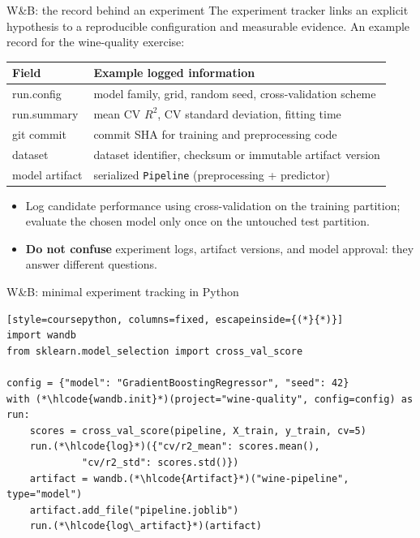 \begin{frame}{W\&B: the record behind an experiment}
\begingroup\footnotesize
The experiment tracker links an explicit hypothesis to a reproducible configuration and measurable evidence. An example record for the wine-quality exercise:
\vspace{0.4em}
\begin{tabularx}{\textwidth}{>{\ttfamily}l X}
\normalfont\bfseries Field & \bfseries Example logged information \\
\toprule
run.config & model family, grid, random seed, cross-validation scheme \\
run.summary & mean CV $R^2$, CV standard deviation, fitting time \\
git commit & commit SHA for training and preprocessing code \\
dataset & dataset identifier, checksum or immutable artifact version \\
model artifact & serialized \texttt{Pipeline} (preprocessing + predictor) \\
\bottomrule
\end{tabularx}
\par\endgroup
\vspace{0.5em}
\begin{itemize}\footnotesize
\item Log candidate performance using cross-validation on the training partition; evaluate the chosen model only once on the untouched test partition.
\item \textbf{Do not confuse} experiment logs, artifact versions, and model approval: they answer different questions.
\end{itemize}
\coursefooter
\end{frame}

\begin{frame}[fragile]{W\&B: minimal experiment tracking in Python}
\begin{lstlisting}[style=coursepython, columns=fixed, escapeinside={(*}{*)}]
import wandb
from sklearn.model_selection import cross_val_score

config = {"model": "GradientBoostingRegressor", "seed": 42}
with (*\hlcode{wandb.init}*)(project="wine-quality", config=config) as run:
    scores = cross_val_score(pipeline, X_train, y_train, cv=5)
    run.(*\hlcode{log}*)({"cv/r2_mean": scores.mean(),
             "cv/r2_std": scores.std()})
    artifact = wandb.(*\hlcode{Artifact}*)("wine-pipeline", type="model")
    artifact.add_file("pipeline.joblib")
    run.(*\hlcode{log\_artifact}*)(artifact)
\end{lstlisting}
\coursefooter
\end{frame}

